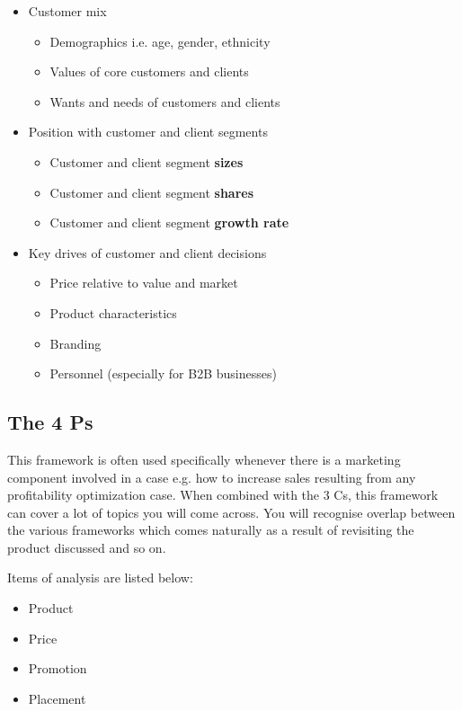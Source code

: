 \documentclass[a4paper]{article}
\begin{document}
{\begin{itemize}
	\item Customer mix
		\begin{itemize}
			\item Demographics i.e. age, gender, ethnicity
			\item Values of core customers and clients
			\item Wants and needs of customers and clients
		\end{itemize}
	\item Position with customer and client segments
		\begin{itemize}
			\item Customer and client segment \textbf{sizes}
			\item Customer and client segment \textbf{shares}
			\item Customer and client segment \textbf{growth rate}
		\end{itemize}
	\item Key drives of customer and client decisions
		\begin{itemize}
			\item Price relative to value and market
			\item Product characteristics
			\item Branding
			\item Personnel (especially for B2B businesses)
		\end{itemize}
\end{itemize}

\subsection{The 4 Ps}
This framework is often used specifically whenever there is a marketing component involved in a case e.g. how to increase sales resulting from any profitability optimization case. When combined with the 3 Cs, this framework can cover a lot of topics you will come across. You will recognise overlap between the various frameworks which comes naturally as a result of revisiting the product discussed and so on.

\vspace{5pt}
\noindent Items of analysis are listed below:
\begin{itemize}
	\item Product
	\item Price
	\item Promotion
	\item Placement
\end{itemize}

}
\end{document}
